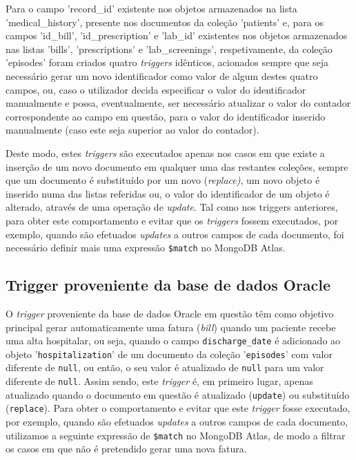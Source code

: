 Para o campo 'record\_id' existente nos objetos armazenados na lista 'medical\_history', presente nos documentos da coleção 'patients' e, para os campos 'id\_bill', 'id\_prescription' e 'lab\_id' existentes nos objetos armazenados nas listas 'bills', 'prescriptions' e 'lab\_screenings', respetivamente, da coleção 'episodes' foram criados quatro \textit{triggers} idênticos, acionados sempre que seja necessário gerar um novo identificador como valor de algum destes quatro campos, ou, caso o utilizador decida especificar o valor do identificador manualmente e possa, eventualmente, ser necessário atualizar o valor do contador correspondente ao campo em questão, para o valor do identificador inserido manualmente (caso este seja superior ao valor do contador). 

Deste modo, estes \textit{triggers} são executados apenas nos casos em que existe a inserção de um novo documento em qualquer uma das restantes coleções, sempre que um documento é substituído por um novo (\textit{replace)}, um novo objeto é inserido numa das listas referidas ou, o valor do identificador de um objeto é alterado, através de uma operação de \textit{update}. Tal como nos triggers anteriores, para obter este comportamento e evitar que os \textit{triggers} fossem executados, por exemplo, quando são efetuados \textit{updates} a outros campos de cada documento, foi necessário definir mais uma expressão \texttt{\$match} no MongoDB Atlas.


\subsection{Trigger proveniente da base de dados Oracle}

O \textit{trigger} proveniente da base de dados Oracle em questão têm como objetivo principal gerar automaticamente uma fatura (\textit{bill}) quando um paciente recebe uma alta hospitalar, ou seja, quando o campo \texttt{discharge\_date} é adicionado ao objeto '\texttt{hospitalization}' de um documento da coleção '\texttt{episodes}' com valor diferente de \texttt{null}, ou então, o seu valor é atualizado de \texttt{null} para um valor diferente de \texttt{null}. Assim sendo, este \textit{trigger} é, em primeiro lugar, apenas atualizado quando o documento em questão é atualizado (\texttt{update}) ou substituído (\texttt{replace}).
Para obter o comportamento e evitar que este \textit{trigger} fosse executado, por exemplo, quando são efetuados \textit{updates} a outros campos de cada documento, utilizamos a seguinte expressão de \texttt{\$match} no MongoDB Atlas, de modo a filtrar os casos em que não é pretendido gerar uma nova fatura.

